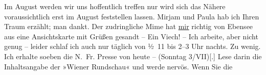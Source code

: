\pstart
           Im August werden wir uns hoffentlich treffen nur wird sich das Nähere
               voraussichtlich erst im August feststellen lassen. Mirjam und Paula hab ich
               Ihren Traum erzählt; man {\pb}dankt.
               Der zudringliche Mime hat
                  \uline{mir} richtig von Ebensee aus eine Ansichtskarte mit Grüßen gesandt – Ein Viech! – Ich
               arbeite, aber nicht genug – leider schlaf ich auch nur täglich von ½ 11
               bis 2–3 Uhr nachts. Zu wenig. Ich erhalte {\pb}soeben die N. Fr. Presse von heute – (Sonntag
                  3/VII){[}.{]} Lese darin die Inhaltsangabe der »Wiener Rundschau« und werde nervös. Wenn Sie die
